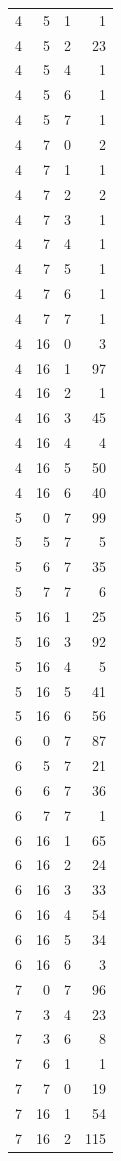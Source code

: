 \begin{longtable}{rrrr}
4 & 5 & 1 & 1\\
4 & 5 & 2 & 23\\
4 & 5 & 4 & 1\\
4 & 5 & 6 & 1\\
4 & 5 & 7 & 1\\
4 & 7 & 0 & 2\\
4 & 7 & 1 & 1\\
4 & 7 & 2 & 2\\
4 & 7 & 3 & 1\\
4 & 7 & 4 & 1\\
4 & 7 & 5 & 1\\
4 & 7 & 6 & 1\\
4 & 7 & 7 & 1\\
4 & 16 & 0 & 3\\
4 & 16 & 1 & 97\\
4 & 16 & 2 & 1\\
4 & 16 & 3 & 45\\
4 & 16 & 4 & 4\\
4 & 16 & 5 & 50\\
4 & 16 & 6 & 40\\
5 & 0 & 7 & 99\\
5 & 5 & 7 & 5\\
5 & 6 & 7 & 35\\
5 & 7 & 7 & 6\\
5 & 16 & 1 & 25\\
5 & 16 & 3 & 92\\
5 & 16 & 4 & 5\\
5 & 16 & 5 & 41\\
5 & 16 & 6 & 56\\
6 & 0 & 7 & 87\\
6 & 5 & 7 & 21\\
6 & 6 & 7 & 36\\
6 & 7 & 7 & 1\\
6 & 16 & 1 & 65\\
6 & 16 & 2 & 24\\
6 & 16 & 3 & 33\\
6 & 16 & 4 & 54\\
6 & 16 & 5 & 34\\
6 & 16 & 6 & 3\\
7 & 0 & 7 & 96\\
7 & 3 & 4 & 23\\
7 & 3 & 6 & 8\\
7 & 6 & 1 & 1\\
7 & 7 & 0 & 19\\
7 & 16 & 1 & 54\\
7 & 16 & 2 & 115\\

\end{longtable}
